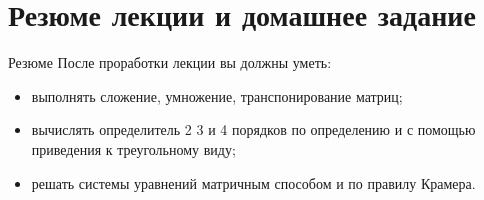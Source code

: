 \documentclass[unicode,11pt,notheorems]{beamer}
\begin{document}
	
\section{Резюме лекции и домашнее задание}
\begin{frame}{Резюме}
	После проработки лекции вы должны уметь:
	\begin{itemize}
	\item 
		выполнять сложение, умножение, транспонирование матриц;
	\item 
		вычислять определитель 2 3 и 4 порядков по определению и с помощью приведения к треугольному виду;
	\item 
		решать системы уравнений матричным способом и по правилу Крамера.
	\end{itemize}		
\end{frame}
\end{document}
